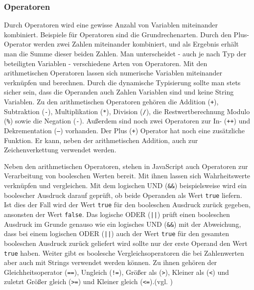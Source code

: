 \subsubsection{Operatoren} \glqq Durch Operatoren wird eine gewisse Anzahl von Variablen miteinander kombiniert. Beispiele für Operatoren sind die Grundrechenarten. Durch den Plus-Operator werden zwei Zahlen miteinander kombiniert, und als Ergebnis erhält man die Summe dieser beiden Zahlen. Man unterscheidet - auch je nach Typ der beteiligten Variablen - verschiedene Arten von Operatoren.\grqq{}\cite[S.69]{WenzJava2008} Mit den arithmetischen Operatoren lassen sich numerische Variablen miteinander verknüpfen und berechnen. Durch die dynamische Typisierung sollte man stets sicher sein, dass die Operanden auch Zahlen Variablen sind und keine String Variablen. Zu den arithmetischen Operatoren gehören die Addition (\texttt{+}), Subtraktion (\texttt{-}), Multiplikation (\texttt{*}), Division (\texttt{/}), die Restwertberechnung Modulo (\texttt{\%}) sowie die Negation (\texttt{-}). Außerdem sind noch zwei Operatoren zur In- (\texttt{++}) und Dekrementation (\texttt{--}) vorhanden. Der Plus (\texttt{+}) Operator hat noch eine zusätzliche Funktion. Er kann, neben der arithmetischen Addition, auch zur Zeichenverkettung verwendet werden.\par Neben den arithmetischen Operatoren, stehen in JavaScript auch Operatoren zur Verarbeitung von booleschen Werten bereit. Mit ihnen lassen sich Wahrheitswerte verknüpfen und vergleichen. Mit dem logischen UND (\texttt{\&\&}) beispielsweise wird ein boolescher Ausdruck darauf geprüft, ob beide Operanden als Wert \texttt{true} liefern. Ist dies der Fall wird der Wert \texttt{true} für den booleschen Ausdruck zurück gegeben, ansonsten der Wert \texttt{false}. Das logische ODER (\texttt{||}) prüft einen booleschen Ausdruck im Grunde genauso wie ein logisches UND (\texttt{\&\&}) mit der Abweichung, dass bei einem logischen ODER (\texttt{||}) auch der Wert \texttt{true} für den gesamten booleschen Ausdruck zurück geliefert wird sollte nur der erste Operand den Wert \texttt{true} haben. Weiter gibt es boolesche Vergleichsoperatoren die bei Zahlenwerten aber auch mit Strings verwendet werden können. Zu ihnen gehören der Gleichheitsoperator (\texttt{==}), Ungleich (\texttt{!=}), Größer als (\texttt{\textgreater}), Kleiner als (\texttt{\textless}) und zuletzt Größer gleich (\texttt{\textgreater=}) und Kleiner gleich (\texttt{\textless=}).(vgl. \cite[S.71ff]{WenzJava2008})

